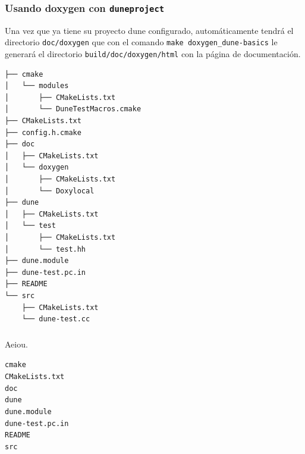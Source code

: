 \begin{frame}[fragile]
	\frametitle{Usando doxygen con \lstinline{duneproject}}

	Una vez que ya tiene su proyecto dune configurado, automáticamente tendrá el directorio \lstinline{doc/doxygen} que con el comando \lstinline{make doxygen_dune-basics} le generará el directorio \lstinline{build/doc/doxygen/html} con la página de documentación.

	\scriptsize
	\begin{verbatim}
├── cmake
│   └── modules
│       ├── CMakeLists.txt
│       └── DuneTestMacros.cmake
├── CMakeLists.txt
├── config.h.cmake
├── doc
│   ├── CMakeLists.txt
│   └── doxygen
│       ├── CMakeLists.txt
│       └── Doxylocal
├── dune
│   ├── CMakeLists.txt
│   └── test
│       ├── CMakeLists.txt
│       └── test.hh
├── dune.module
├── dune-test.pc.in
├── README
└── src
    ├── CMakeLists.txt
    └── dune-test.cc
\end{verbatim}
\end{frame}

\begin{frame}[fragile]
	\frametitle{}
	Aeiou.
	\begin{description}
		\item[\texttt{cmake}]
		\item[\texttt{CMakeLists.txt}]
		\item[\texttt{doc}]
		\item[\texttt{dune}]
		\item[\texttt{dune.module}]
		\item[\texttt{dune-test.pc.in}]
		\item[\texttt{README}]
		\item[\texttt{src}]
	\end{description}
\end{frame}

